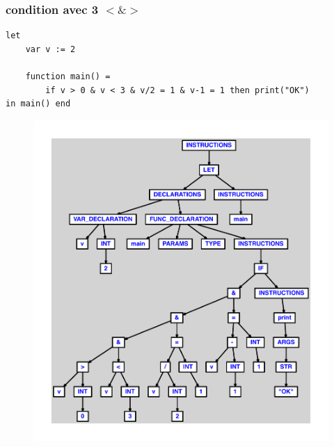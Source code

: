 \documentclass{article}
\begin{document}
\subsubsection{condition avec 3 $ < $$ \& $$ > $}
\begin{lstlisting}
let
	var v := 2

	function main() =
		if v > 0 & v < 3 & v/2 = 1 & v-1 = 1 then print("OK")
in main() end
\end{lstlisting}
\newpage
\begin{figure}[H]
\centering
\includegraphics[max width=\textwidth]{ast/ast_3.pdf}
\end{figure}
\newpage
\end{document}
